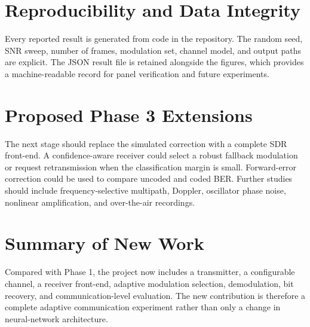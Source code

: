 \section{Reproducibility and Data Integrity}
Every reported result is generated from code in the repository. The random
seed, SNR sweep, number of frames, modulation set, channel model, and output
paths are explicit. The JSON result file is retained alongside the figures,
which provides a machine-readable record for panel verification and future
experiments.

\section{Proposed Phase 3 Extensions}
The next stage should replace the simulated correction with a complete SDR
front-end. A confidence-aware receiver could select a robust fallback
modulation or request retransmission when the classification margin is small.
Forward-error correction could be used to compare uncoded and coded BER.
Further studies should include frequency-selective multipath, Doppler,
oscillator phase noise, nonlinear amplification, and over-the-air recordings.

\section{Summary of New Work}
Compared with Phase 1, the project now includes a transmitter, a configurable
channel, a receiver front-end, adaptive modulation selection, demodulation,
bit recovery, and communication-level evaluation. The new contribution is
therefore a complete adaptive communication experiment rather than only a
change in neural-network architecture.
